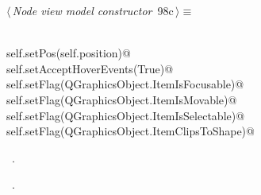 \documentclass[
    a4paper,      %
    10pt,         %
    openright,    %
    notitlepage,  %
    parskip=half, %
]{scrreprt}       %
\theoremstyle{definition}                    %
\begin{document}
\begin{flushleft} \small
\begin{minipage}{\linewidth}\label{scrap159}\raggedright\small
{} $\langle\,${\itshape Node view model constructor}\nobreak\ {\footnotesize {98c}}$\,\rangle\equiv$
\vspace{-1exm}
\begin{list}{}{} \item
\mbox{}\lstinline@@\\
\mbox{}\lstinline@    self.setPos(self.position)@\\
\mbox{}\lstinline@    self.setAcceptHoverEvents(True)@\\
\mbox{}\lstinline@    self.setFlag(QGraphicsObject.ItemIsFocusable)@\\
\mbox{}\lstinline@    self.setFlag(QGraphicsObject.ItemIsMovable)@\\
\mbox{}\lstinline@    self.setFlag(QGraphicsObject.ItemIsSelectable)@\\
\mbox{}\lstinline@    self.setFlag(QGraphicsObject.ItemClipsToShape)@\\
\mbox{}\lstinline@@{\NWsep}
\end{list}
\vspace{-1.5ex}
\footnotesize
\begin{list}{}{\setlength{\itemsep}{-\parsep}\setlength{\itemindent}{-\leftmargin}}
\item \NWtxtMacroDefBy\ .
\item \NWtxtMacroRefIn\ .

\item{}
\end{list}
\end{minipage}\vspace{4ex}
\end{flushleft}
\end{document}
